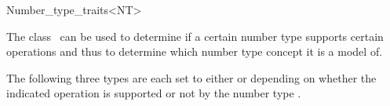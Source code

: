 \begin{ccRefClass}{Number_type_traits<NT>}

\ccDefinition

The class \ccRefName\ can be used to determine if a certain number type
supports certain operations and thus to determine which number type concept
it is a model of.  


\ccTypes

The following three types are each set to either  or
 depending on whether the indicated operation is
supported or not by the number type .


\end{ccRefClass}

